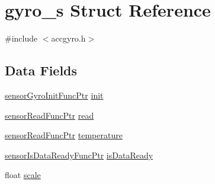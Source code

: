 \hypertarget{structgyro__s}{\section{gyro\+\_\+s Struct Reference}
\label{structgyro__s}
}


{\ttfamily \#include $<$accgyro.\+h$>$}

\subsection*{Data Fields}
\begin{DoxyCompactItemize}
\item 
\hyperlink{sensor_8h_ad900522f143f3d8ceaf333a5c03237d5}{sensor\+Gyro\+Init\+Func\+Ptr} \hyperlink{structgyro__s_a2ad5bbee221adf921b327a639aef0dad}{init}
\item 
\hyperlink{sensor_8h_af1826dc6e1452a4b956e54abacce853e}{sensor\+Read\+Func\+Ptr} \hyperlink{structgyro__s_aa8ff06960a9450a62d6c4a980ac769f3}{read}
\item 
\hyperlink{sensor_8h_af1826dc6e1452a4b956e54abacce853e}{sensor\+Read\+Func\+Ptr} \hyperlink{structgyro__s_ada63f1d22989d555be8c9f1871f00054}{temperature}
\item 
\hyperlink{sensor_8h_a33ad448234dac59249b1a9a8361c79e7}{sensor\+Is\+Data\+Ready\+Func\+Ptr} \hyperlink{structgyro__s_a35abd3db9c89e5471844c403853c12d6}{is\+Data\+Ready}
\item 
float \hyperlink{structgyro__s_af2c9ddf3e57a6d34b0e990429e96c81d}{scale}
\end{DoxyCompactItemize}


